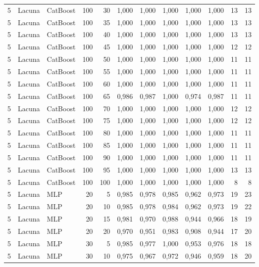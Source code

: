 \begin{longtable}{@{}rllrrrrrrrrr@{}}
5 & Lacuna & CatBoost & 100 & 30 & 1,000 & 1,000 & 1,000 & 1,000 & 1,000 & 13 & 13 \\
5 & Lacuna & CatBoost & 100 & 35 & 1,000 & 1,000 & 1,000 & 1,000 & 1,000 & 13 & 13 \\
5 & Lacuna & CatBoost & 100 & 40 & 1,000 & 1,000 & 1,000 & 1,000 & 1,000 & 13 & 13 \\
5 & Lacuna & CatBoost & 100 & 45 & 1,000 & 1,000 & 1,000 & 1,000 & 1,000 & 12 & 12 \\
5 & Lacuna & CatBoost & 100 & 50 & 1,000 & 1,000 & 1,000 & 1,000 & 1,000 & 11 & 11 \\
5 & Lacuna & CatBoost & 100 & 55 & 1,000 & 1,000 & 1,000 & 1,000 & 1,000 & 11 & 11 \\
5 & Lacuna & CatBoost & 100 & 60 & 1,000 & 1,000 & 1,000 & 1,000 & 1,000 & 11 & 11 \\
5 & Lacuna & CatBoost & 100 & 65 & 0,986 & 0,987 & 1,000 & 0,974 & 0,987 & 11 & 11 \\
5 & Lacuna & CatBoost & 100 & 70 & 1,000 & 1,000 & 1,000 & 1,000 & 1,000 & 12 & 12 \\
5 & Lacuna & CatBoost & 100 & 75 & 1,000 & 1,000 & 1,000 & 1,000 & 1,000 & 12 & 12 \\
5 & Lacuna & CatBoost & 100 & 80 & 1,000 & 1,000 & 1,000 & 1,000 & 1,000 & 11 & 11 \\
5 & Lacuna & CatBoost & 100 & 85 & 1,000 & 1,000 & 1,000 & 1,000 & 1,000 & 11 & 11 \\
5 & Lacuna & CatBoost & 100 & 90 & 1,000 & 1,000 & 1,000 & 1,000 & 1,000 & 11 & 11 \\
5 & Lacuna & CatBoost & 100 & 95 & 1,000 & 1,000 & 1,000 & 1,000 & 1,000 & 13 & 13 \\
5 & Lacuna & CatBoost & 100 & 100 & 1,000 & 1,000 & 1,000 & 1,000 & 1,000 & 8 & 8 \\
5 & Lacuna & MLP & 20 & 5 & 0,985 & 0,978 & 0,985 & 0,962 & 0,973 & 19 & 23 \\
5 & Lacuna & MLP & 20 & 10 & 0,985 & 0,978 & 0,984 & 0,962 & 0,973 & 19 & 22 \\
5 & Lacuna & MLP & 20 & 15 & 0,981 & 0,970 & 0,988 & 0,944 & 0,966 & 18 & 19 \\
5 & Lacuna & MLP & 20 & 20 & 0,970 & 0,951 & 0,983 & 0,908 & 0,944 & 17 & 20 \\
5 & Lacuna & MLP & 30 & 5 & 0,985 & 0,977 & 1,000 & 0,953 & 0,976 & 18 & 18 \\
5 & Lacuna & MLP & 30 & 10 & 0,975 & 0,967 & 0,972 & 0,946 & 0,959 & 18 & 20 \\

\end{longtable}
